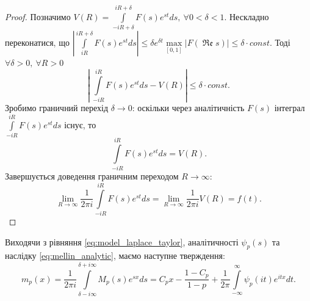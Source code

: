 \begin{corollary}
\begin{proof}
Позначимо $V(R)=\int\limits_{-iR + \delta}^{iR + \delta} F(s) e^{st} ds, ~\forall 0 < \delta < 1$. Нескладно переконатися, що 
$|\int\limits_{iR}^{iR + \delta} F(s) e^{st} ds| \leq \delta e^{\delta t} \max\limits_{[0,1]} |F(\operatorname{\mathfrak{Re}} s)| \leq \delta \cdot const$. Тоді $\forall \delta > 0, ~\forall R > 0$
\begin{equation*}
\left|~\int\limits_{-iR}^{iR} F(s) e^{st} ds - V(R)\right| \leq \delta \cdot const.
\end{equation*}
Зробимо граничний перехід $\delta \rightarrow 0$: оскільки через аналітичність $F(s)$ інтеграл $\int\limits_{-iR}^{iR} F(s) e^{st} ds$ існує, то
\begin{equation*}
\int\limits_{-iR}^{iR} F(s) e^{st} ds = V(R).
\end{equation*}
Завершується доведення граничним переходом $R \rightarrow \infty$:
\begin{equation*}
\lim\limits_{R \rightarrow \infty} \frac{1}{2\pi i} \int\limits_{-iR}^{iR} F(s) e^{st} ds =\lim\limits_{R \rightarrow \infty}\frac{1}{2\pi i} V(R) = f(t).
\end{equation*}
\end{proof}
\end{corollary}

Виходячи з рівняння \eqref{eq:model_laplace_taylor}, аналітичності $\psi_{p} (s)$ та наслідку \eqref{eq:mellin_analytic}, маємо наступне тверждення:
\begin{equation}
m_{p}(x) = \frac{1}{2\pi i} \int\limits_{\delta - i\infty}^{\delta + i\infty} M_{p}(s) e^{sx} ds = C_{p} x - \frac{1 - C_p}{1-p} + \frac{1}{2\pi} \int\limits_{-\infty}^{\infty} \psi_{p}(it) e^{itx} dt.
\end{equation}

